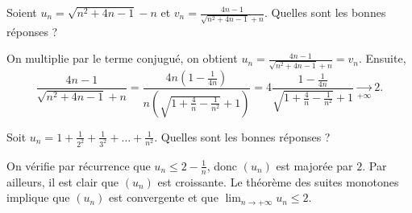 \begin{question}
Soient $\displaystyle u_n=\sqrt{n^2+4n-1}-n$ et $\displaystyle v_n=\frac{4n-1}{\sqrt{n^2+4n-1}+n}$. Quelles sont les bonnes réponses ?
\begin{answers}  
\end{answers}
\begin{explanations}
On multiplie par le terme conjugué, on obtient $\displaystyle u_n=\frac{4n-1}{\sqrt{n^2+4n-1}+n}=v_n$. Ensuite,
$$\frac{4n-1}{\sqrt{n^2+4n-1}+n}=\frac{4n\left(1-\frac{1}{4n}\right)}{n\left(\sqrt{1+\frac{4}{n}-\frac{1}{n^2}}+1\right)}=4\frac{1-\frac{1}{4n}}{\sqrt{1+\frac{4}{n}-\frac{1}{n^2}}+1}\underset{+\infty}{\longrightarrow}2.$$
\end{explanations}
\end{question}



\begin{question}
Soit $\displaystyle u_n=1+\frac{1}{2^2}+\frac{1}{3^2}+\dots +\frac{1}{n^2}$. Quelles sont les bonnes réponses ?
\begin{answers}  
\end{answers}
\begin{explanations}
On vérifie par récurrence que $\displaystyle u_n\leq 2-\frac{1}{n}$, donc $(u_n)$ est majorée par $2$. Par ailleurs, il est clair que $(u_n)$ est croissante. Le théorème des suites monotones implique que $(u_n)$ est convergente et que $\displaystyle \lim _{n\to +\infty}u_n\leq 2$.
\end{explanations}
\end{question}




